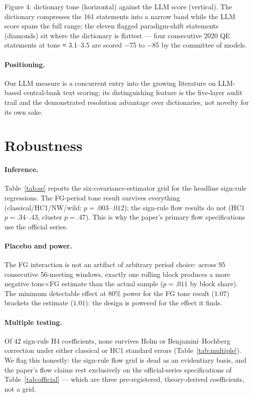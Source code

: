 \documentclass[11pt]{article}
\begin{document}
Figure 4: dictionary tone (horizontal) against the LLM score (vertical). The dictionary compresses the 161 statements into a narrow band while the LLM score spans the full range; the eleven flagged paradigm-shift statements (diamonds) sit where the dictionary is flattest --- four consecutive 2020 QE statements at tone ≈ 3.1--3.5 are scored −75 to −85 by the committee of models.

\paragraph{Positioning.} Our LLM measure is a concurrent entry into the growing literature on LLM-based central-bank text scoring; its distinguishing feature is the five-layer audit trail and the demonstrated resolution advantage over dictionaries, not novelty for its own sake.

\section{Robustness}\label{sec:robustness}

\paragraph{Inference.} Table~\ref{tab:se} reports the six-covariance-estimator
grid for the headline sign-rule regressions. The FG-period tone result
survives everything (classical/HC1/NW/wild: $p=.003$--$.012$); the sign-rule
flow results do not (HC1 $p=.34$--$.43$, cluster $p=.47$). This is why the
paper's primary flow specifications use the official series.

\paragraph{Placebo and power.} The FG interaction is not an artifact of
arbitrary period choice: across 95 consecutive 56-meeting windows, exactly
one rolling block produces a more negative tone$\times$FG estimate than the
actual sample ($p=.011$ by block share). The minimum detectable effect at
80\% power for the FG tone result ($1.07$) brackets the estimate ($1.01$):
the design is powered for the effect it finds.

\paragraph{Multiple testing.} Of 42 sign-rule H4 coefficients, none survives
Holm or Benjamini--Hochberg correction under either classical or HC1
standard errors (Table~\ref{tab:multiple}). We flag this honestly: the
sign-rule flow grid is dead as an evidentiary basis, and the paper's flow
claims rest exclusively on the official-series specifications of
Table~\ref{tab:official} --- which are three pre-registered, theory-derived
coefficients, not a grid.
\end{document}

